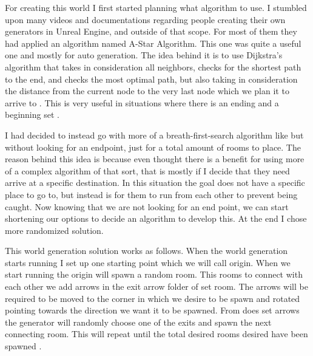 \documentclass{../../Styles/AI-Research-STY}
\begin{document}
\begin{Form}
{		For creating this world I first started planning what algorithm to use. I stumbled upon many videos and
		documentations regarding people creating their own generators in Unreal Engine, and outside of that scope.
		For most of them they had applied an algorithm named A-Star Algorithm. This one was quite a useful one and mostly
		for auto generation. The idea behind it is to use Dijkstra's algorithm that takes in consideration all neighbors,
		checks for the shortest path to the end, and checks the most optimal path, but also taking in consideration the
		distance from the current node to the very last node which we plan it to arrive to \parencite{AStarAlgorithm}. This is very useful in situations
		where there is an ending and a beginning set \parencite{IRewroteMyDungeonGenerator}.

		I had decided to instead go with more of a breath-first-search algorithm \parencite{BreadthFirstSearch} like but without looking for an
		endpoint, just for a total amount of rooms to place. The reason behind this idea is because even thought
		there is a benefit for using more of a complex algorithm of that sort, that is mostly if I decide that they need
		arrive at a specific destination. In this situation the goal does not have a specific place to go to, but
		instead is for them to run from each other to prevent being caught. Now knowing that we are not looking for an
		end point, we can start shortening our options to decide an algorithm to develop this. At the end I chose more
		randomized solution.

		This world generation solution works as follows. When the world generation starts running I set up one starting
		point which we will call origin. When we start running the origin will spawn a random room. This rooms to connect
		with each other we add arrows in the exit arrow folder of set room. The arrows will be required to be moved to the
		corner in which we desire to be spawn and rotated pointing towards the direction we want it to be spawned. From
		does set arrows the generator will randomly choose one of the exits and spawn the next connecting room. This will
		repeat until the total desired rooms desired have been spawned \parencite{HowToCreateEpicProceduralDungeons}.


		}
\end{Form}
\end{document}
